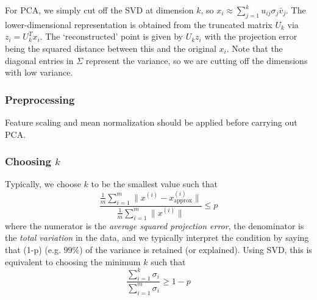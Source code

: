 \documentclass[a4paper,12pt]{article}
\theoremstyle{definition}
\begin{document}
For PCA, we simply cut off the SVD at dimension $k$, so $x_{i} \approx \sum_{j = 1}^{k} u_{ij} \sigma_{j} \bar{v}_j$. The lower-dimensional representation is obtained from the truncated matrix $U_{k}$ via $z_i =  U_{k}^T x_i$. The `reconstructed' point is given by $U_{k} z_i$ with the projection error being the squared distance between this and the original $x_i$. Note that the diagonal entries in $\Sigma$ represent the variance, so we are cutting off the dimensions with low variance. 

\subsubsection{Preprocessing}
Feature scaling and mean normalization should be applied before carrying out PCA.

\subsubsection{Choosing $k$}
Typically, we choose $k$ to be the smallest value such that 
\[
\frac{\frac{1}{m} \sum_{i=1}^{m} \| x^{(i)} - x^{(i)}_{\text{approx}} \|}{\frac{1}{m} \sum_{i=1}^{m} \| x^{(i)} \|} \leq p
\]
where the numerator is the \emph{average squared projection error}, the denominator is the \emph{total variation} in the data, and we typically interpret the condition by saying that (1-p) (e.g. $99\%$) of the variance is retained (or explained). Using SVD, this is equivalent to choosing the minimum $k$ such that 
\[
\frac{\sum_{i=1}^{k} \sigma_i}{\sum_{i=1}^{m} \sigma_i} \geq 1- p
\]
\end{document}
